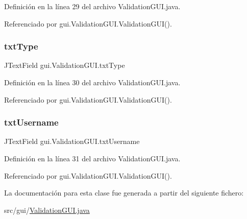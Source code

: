 Definición en la línea 29 del archivo Validation\+G\+U\+I.\+java.



Referenciado por gui.\+Validation\+G\+U\+I.\+Validation\+G\+U\+I().

\mbox{\label{classgui_1_1_validation_g_u_i_aa8db43a7c80fcde4ced14b40c8a92920}} 
\subsubsection{\texorpdfstring{txtType}{txtType}}
{\footnotesize\ttfamily J\+Text\+Field gui.\+Validation\+G\+U\+I.\+txt\+Type\hspace{0.3cm}{\ttfamily [private]}}



Definición en la línea 30 del archivo Validation\+G\+U\+I.\+java.



Referenciado por gui.\+Validation\+G\+U\+I.\+Validation\+G\+U\+I().

\mbox{\label{classgui_1_1_validation_g_u_i_a5d0148dc1550e58e9497c1897189c07c}} 
\subsubsection{\texorpdfstring{txtUsername}{txtUsername}}
{\footnotesize\ttfamily J\+Text\+Field gui.\+Validation\+G\+U\+I.\+txt\+Username\hspace{0.3cm}{\ttfamily [private]}}



Definición en la línea 31 del archivo Validation\+G\+U\+I.\+java.



Referenciado por gui.\+Validation\+G\+U\+I.\+Validation\+G\+U\+I().



La documentación para esta clase fue generada a partir del siguiente fichero\+:\begin{DoxyCompactItemize}
\item 
src/gui/\mbox{\hyperlink{_validation_g_u_i_8java}{Validation\+G\+U\+I.\+java}}\end{DoxyCompactItemize}
